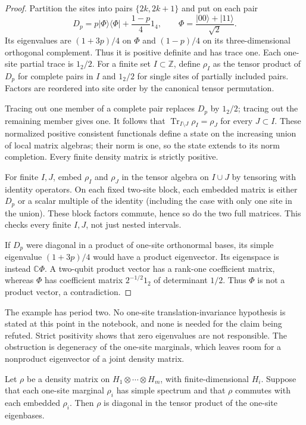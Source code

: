 \begin{proof}
Partition the sites into pairs $\{2k,2k+1\}$ and put on each pair
\[
 D_p=p|\Phi\rangle\langle\Phi|+\frac{1-p}{4}1_4,
 \qquad \Phi=\frac{|00\rangle+|11\rangle}{\sqrt2}.
\]
Its eigenvalues are $(1+3p)/4$ on $\Phi$ and $(1-p)/4$ on its
three-dimensional orthogonal complement. Thus it is positive
definite and has trace one. Each one-site partial trace is $1_2/2$.
For a finite set $I\subset\mathbb Z$, define $\rho_I$ as the
tensor product of $D_p$ for complete pairs in $I$ and $1_2/2$ for
single sites of partially included pairs. Factors are reordered
into site order by the canonical tensor permutation.

Tracing out one member of a complete pair replaces $D_p$ by
$1_2/2$; tracing out the remaining member gives one. It follows
that $\operatorname{Tr}_{I\setminus J}\rho_I=\rho_J$ for every
$J\subset I$. These normalized positive consistent functionals
define a state on the increasing union of local matrix algebras;
their norm is one, so the state extends to its norm completion.
Every finite density matrix is strictly positive.

For finite $I,J$, embed $\rho_I$ and $\rho_J$ in the tensor
algebra on $I\cup J$ by tensoring with identity operators. On each
fixed two-site block, each embedded matrix is either $D_p$ or a
scalar multiple of the identity (including the case with only one
site in the union). These block factors commute, hence so do the
two full matrices. This checks every finite $I,J$, not just nested
intervals.

If $D_p$ were diagonal in a product of one-site orthonormal bases,
its simple eigenvalue $(1+3p)/4$ would have a product eigenvector.
Its eigenspace is instead $\mathbb C\Phi$. A two-qubit product
vector has a rank-one coefficient matrix, whereas $\Phi$ has
coefficient matrix $2^{-1/2}1_2$ of determinant $1/2$. Thus
$\Phi$ is not a product vector, a contradiction.
\end{proof}

The example has period two. No one-site translation-invariance
hypothesis is stated at this point in the notebook, and none is
needed for the claim being refuted. Strict positivity shows that
zero eigenvalues are not responsible. The obstruction is
degeneracy of the one-site marginals, which leaves room for a
nonproduct eigenvector of a joint density matrix.

\begin{proposition}\ours{}
Let $\rho$ be a density matrix on
$H_1\otimes\cdots\otimes H_m$, with finite-dimensional $H_i$.
Suppose that each one-site marginal $\rho_i$ has simple spectrum
and that $\rho$ commutes with each embedded $\rho_i$. Then $\rho$
is diagonal in the tensor product of the one-site eigenbases.
\end{proposition}


